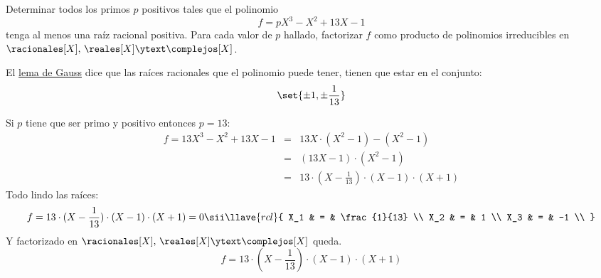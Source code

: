 \begin{enunciado}{\ejExtra}
  Determinar todos los primos $p$  positivos tales que el polinomio
  $$
    f = p X^3 - X^2 + 13X - 1
  $$
  tenga al menos una raíz racional positiva. Para cada valor de $p$ hallado, factorizar $f$ como producto de polinomios irreducibles en
  $\racionales[X],\,\reales[X] \ytext \complejos[X]$.
\end{enunciado}
El \hyperlink{teoria-7:lema-gauss}{lema de Gauss} dice que las raíces racionales que el polinomio puede tener, tienen que estar en el
conjunto:
$$
  \set{\pm 1, \pm \frac{1}{13}}
$$

Si $p$ tiene que ser primo y positivo entonces $p = 13$:
$$
  \begin{array}{rcl}
    f = 13 X^3 - X^2 + 13X - 1 & = & 13 X \cdot (X^2 - 1) - (X^2 - 1)                      \\
                               & = & (13 X - 1) \cdot (X^2 - 1)                            \\
                               & = & 13\cdot(X - \frac{1}{13}) \cdot (X - 1) \cdot (X + 1)
  \end{array}
$$
Todo lindo las raíces:
$$
  f = 13\cdot(X - \frac{1}{13}) \cdot (X - 1) \cdot (X + 1) = 0
  \sii
  \llave{rcl}{
    X_1 & = & \frac{1}{13} \\
    X_2 & = & 1            \\
    X_3 & = & -1           \\
  }
$$
Y factorizado en $\racionales[X],\, \reales[X] \ytext \complejos[X]$ queda.
$$
  f = 13\cdot(X - \frac{1}{13}) \cdot (X - 1) \cdot (X + 1)
$$

\begin{aportes}
  \item {}
\end{aportes}
